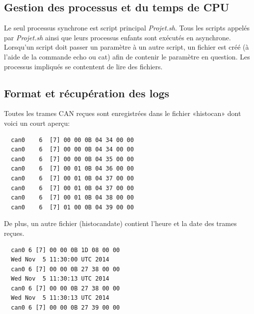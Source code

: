 \documentclass[10pt,a4paper,final]{article}
\begin{document}
\begin{spacing}{1.5}
\subsection{Gestion des processus et du temps de CPU}
Le seul processus synchrone est script principal \textit{Projet.sh}. Tous les scripts appelés par \textit{Projet.sh} ainsi que leurs processus enfants sont exécutés en asynchrone. Lorsqu'un script doit passer un paramètre à un autre script, un fichier est créé (à l'aide de la commande echo ou cat) afin de contenir le paramètre en question. Les processus impliqués se contentent de lire des fichiers.

\subsection{Format et récupération des logs}
Toutes les trames CAN reçues sont enregistrées dans le fichier «histocan» dont voici un court aperçu:
\end{spacing}

\begin{verbatim}
  can0    6  [7] 00 00 0B 04 34 00 00
  can0    6  [7] 00 00 0B 04 34 00 00
  can0    6  [7] 00 00 0B 04 35 00 00
  can0    6  [7] 00 01 0B 04 36 00 00
  can0    6  [7] 00 01 0B 04 37 00 00
  can0    6  [7] 00 01 0B 04 37 00 00
  can0    6  [7] 00 01 0B 04 38 00 00
  can0    6  [7] 01 00 0B 04 39 00 00
\end{verbatim}

De plus, un autre fichier (histocandate) contient l'heure et la date des trames reçues.
\begin{verbatim}
  can0 6 [7] 00 00 0B 1D 08 00 00
  Wed Nov  5 11:30:00 UTC 2014
  can0 6 [7] 00 00 0B 27 38 00 00
  Wed Nov  5 11:30:13 UTC 2014
  can0 6 [7] 00 00 0B 27 38 00 00
  Wed Nov  5 11:30:13 UTC 2014
  can0 6 [7] 00 00 0B 27 39 00 00
\end{verbatim} 
\end{document}
